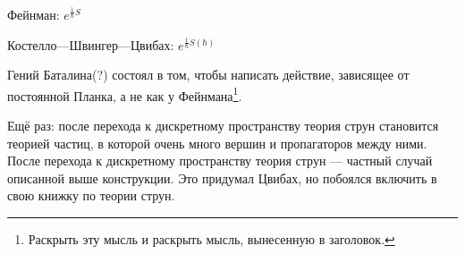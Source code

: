 \documentclass[11pt]{article}
\theoremstyle{remark}
\theoremstyle{definition}
\newcommand{\que}[1]{\footnote{\textcolor[rgb]{0.38,0.69,0.82}{#1}}}
\begin{document}
\begin{center}

Фейнман: $e^{\frac{1}{\hbar} S}$

Костелло---Швингер---Цвибах: $e^{\frac{1}{\hbar} S(\hbar)}$

\end{center}

Гений Баталина(?) состоял в том, чтобы написать действие, зависящее от постоянной Планка, а не как у Фейнмана\que{Раскрыть эту мысль и раскрыть мысль, вынесенную в заголовок.}.

Ещё раз: после перехода к дискретному пространству теория струн становится теорией частиц, в которой очень много вершин и пропагаторов между ними. После перехода к дискретному пространству теория струн --- частный случай описанной выше конструкции. Это придумал Цвибах, но побоялся включить в свою книжку по теории струн.

\end{document}
